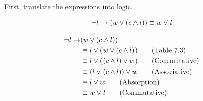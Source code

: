 \begin{questions}
\begin{solution}
First, translate the expressions into logic. 

$$ \neg l \rightarrow (w \vee (c \wedge l)) \equiv w \vee l $$

\begin{align*}
  \neg l \rightarrow & (w \vee (c \wedge l)) \\
    & \equiv l \vee (w \vee (c \wedge l)) \tag{Table 7.3} \\
    & \equiv l \vee ((c \wedge l) \vee w) \tag{Commutative} \\
    & \equiv (l \vee (c \wedge l)) \vee w \tag{Associative} \\
    & \equiv l \vee w \tag{Absorption} \\
    & \equiv w \vee l \tag{Commutative}
\end{align*}

\end{solution}







\end{questions}
